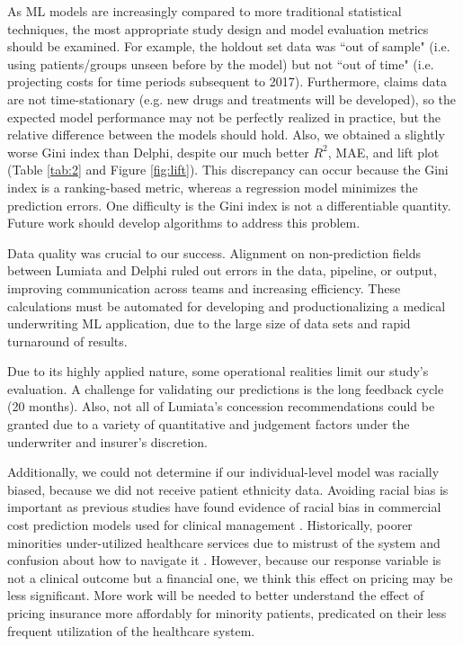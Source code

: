 \documentclass[letterpaper]{article} %
\begin{document}
As ML models are increasingly compared to more traditional statistical techniques, the most appropriate study design and model evaluation metrics should be examined. For example, the holdout set data was ``out of sample" (i.e. using patients/groups unseen before by the model) but not ``out of time" (i.e. projecting costs for time periods subsequent to 2017).  Furthermore, claims data are not time-stationary (e.g. new drugs and treatments will be developed), so the expected model performance may not be perfectly realized in practice, but the relative difference between the models should hold. Also, we obtained a slightly worse Gini index than Delphi, despite our much better $R^2$, MAE, and lift plot (Table \ref{tab:2} and Figure \ref{fig:lift}).  This discrepancy can occur because the Gini index is a ranking-based metric, whereas a regression model minimizes the prediction errors. One difficulty is the Gini index is not a differentiable quantity. Future work should develop algorithms to address this problem.

Data quality was crucial to our success. Alignment on non-prediction fields between Lumiata and Delphi ruled out errors in the data, pipeline, or output, improving communication across teams and increasing efficiency. These calculations must be automated for developing and productionalizing a medical underwriting ML application, due to the large size of data sets and rapid turnaround of results.

Due to its highly applied nature, some operational realities limit our study's evaluation. A challenge for validating our predictions is the long feedback cycle (20 months). Also, not all of Lumiata's concession recommendations could be granted due to a variety of quantitative and judgement factors under the underwriter and insurer's discretion.

Additionally, we could not determine if our individual-level model was racially biased, because we did not receive patient ethnicity data.  Avoiding racial bias is important as previous studies have found evidence of racial bias in commercial cost prediction models used for clinical management \cite{RacialBias}.  Historically, poorer minorities under-utilized healthcare services due to mistrust of the system and confusion about how to navigate it \cite{RacialBias}. However, because our response variable is not a clinical outcome but a financial one, we think this effect on pricing may be less significant.  More work will be needed to better understand the effect of pricing insurance more affordably for minority patients, predicated on their less frequent utilization of the healthcare system.
\end{document}
